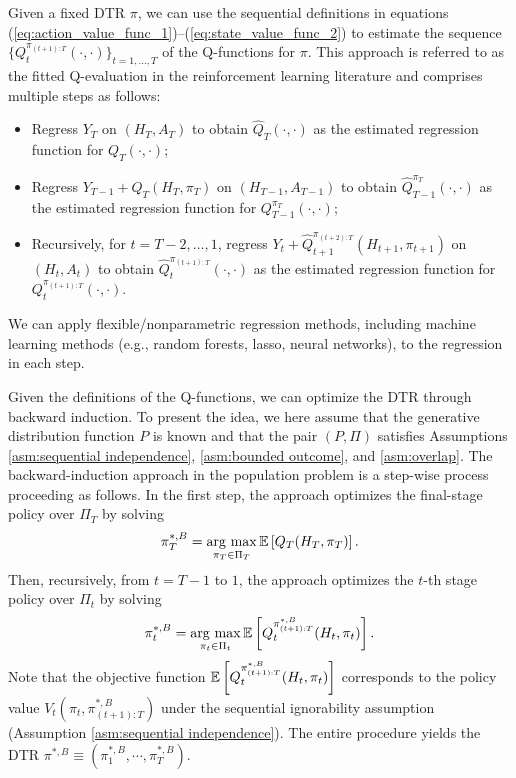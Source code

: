 Given a fixed DTR $\pi$, we can use the sequential definitions in equations (\ref{eq:action_value_func_1})--(\ref{eq:state_value_func_2}) to estimate the sequence $\{Q_{t}^{\pi_{(t+1):T}}(\cdot,\cdot)\}_{t=1,\ldots,T}$ of the Q-functions for $\pi$. This approach is referred to as the fitted Q-evaluation \citep{Munos_et_al_2008,Fonteneau_et_al_2013,Le_et_al_2019} in the  reinforcement learning literature and comprises multiple steps as follows:
\begin{itemize}
    \item Regress $Y_{T}$ on $(H_T,A_T)$ to obtain $\widehat{Q}_{T}(\cdot,\cdot)$ as the estimated regression function for $Q_T(\cdot,\cdot)$;
    \item Regress $Y_{T-1} + \widehat{Q}_{T}(H_{T},\pi_{T})$ on $(H_{T-1},A_{T-1})$ to obtain $\widehat{Q}_{T-1}^{\pi_{T}}(\cdot,\cdot)$ as the estimated regression function for $Q_{T-1}^{\pi_{T}}(\cdot,\cdot)$;
   \item Recursively, for $t=T-2,\ldots,1$, regress $Y_{t} + \widehat{Q}_{t+1}^{\pi_{(t+2):T}}(H_{t+1},\pi_{t+1})$ on $(H_t,A_t)$ to obtain $\widehat{Q}_{t}^{\pi_{(t+1):T}}(\cdot,\cdot)$ as the estimated regression function for $Q_{t}^{\pi_{(t+1):T}}(\cdot,\cdot)$.
\end{itemize}
We can apply flexible/nonparametric regression methods, including machine learning methods (e.g., random forests, lasso, neural networks), to the regression in each step. 


Given the definitions of the Q-functions, we can optimize the DTR through backward induction. To present the idea, we here assume that the generative distribution function $P$ is known and that the pair  $(P,\Pi)$ satisfies Assumptions \ref{asm:sequential independence}, \ref{asm:bounded outcome}, and \ref{asm:overlap}. The backward-induction approach in the population problem is a step-wise process proceeding as follows. 
In the first step, the approach optimizes the final-stage policy over $\Pi_T$ by solving 
\begin{align*}
        \pi_{T}^{\ast,B} = \mathop{\rm arg~max}\limits_{\pi_{T} \in \Pi_{T}} \mathbb{E}\left[Q_{T}(H_{T},\pi_{T})\right].
\end{align*}
Then, recursively, from $t=T-1$ to $1$, the approach optimizes the $t$-th stage policy over $\Pi_{t}$ by solving
\begin{align*}
        \pi_{t}^{\ast,B} = \mathop{\rm arg~max}\limits_{\pi_{t} \in \Pi_{t}} \mathbb{E}\left[Q_{t}^{\pi_{(t+1):T}^{\ast,B}}(H_{t},\pi_{t})\right].
\end{align*}
Note that the objective function $\mathbb{E}\left[Q_{t}^{\pi_{(t+1):T}^{\ast,B}}(H_{t},\pi_{t})\right]$ corresponds to the policy value $V_{t}(\pi_{t},\pi_{(t+1):T}^{\ast,B})$ under the sequential ignorability assumption (Assumption \ref{asm:sequential independence}).
The entire procedure yields the DTR $\pi^{\ast,B} \equiv (\pi_{1}^{\ast,B},\cdots,\pi_{T}^{\ast,B})$.

